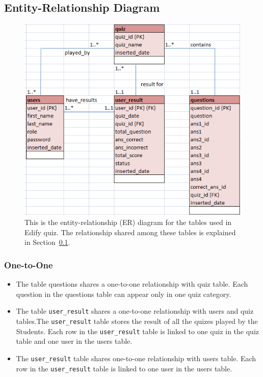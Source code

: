 \subsection{Entity-Relationship Diagram}
\label{sub:entity_relationship_diagram}

\begin{figure}[htpb]
	\centering
	\includegraphics[width=0.8\linewidth]{img/Entity_Relationship_Diagram.png}
	\caption{This is the entity-relationship (ER) diagram for the tables used
	in Edify quiz. The relationship shared among these tables is explained in
	Section~\ref{sub:entity_relationship_diagram}.
	}\label{fig:entity_relationship_diagram}
\end{figure}

\subsubsection{One-to-One}
\label{ssub:One-to-one}
\begin{itemize}

	\item The table questions shares a one-to-one relationship with quiz table.
		Each question in the questions table can appear only in one quiz
		category.

	\item The table \verb+user_result+ shares a one-to-one relationship with
		users and quiz tables.The \verb+user_result+ table stores the result of
		all the quizes played by the Students. Each row in the
		\verb+user_result+ table is linked to one quiz in the quiz table and
		one user in the users table.

	\item The \verb+user_result+ table shares one-to-one relationship with
		users table. Each row in the \verb+user_result+ table is linked to one
		user in the users table.

\end{itemize}

